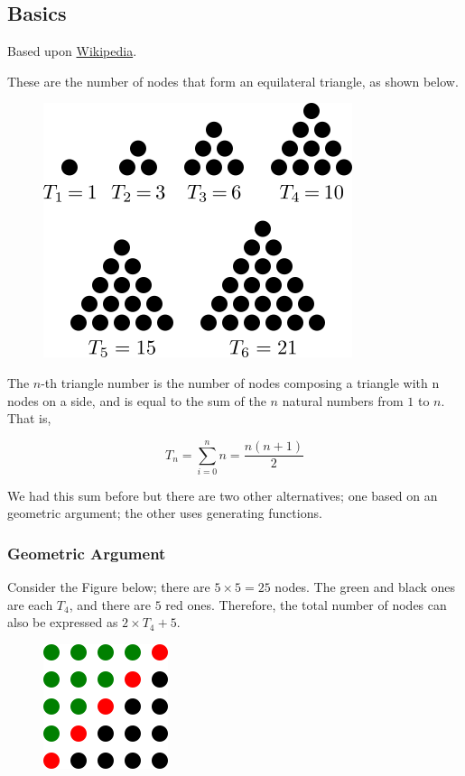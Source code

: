 
\subsection{Basics}

Based upon \href{https://en.wikipedia.org/wiki/Triangular_number}{Wikipedia}.

These are the number of nodes that form an equilateral triangle, as
shown below.

\begin{figure}[H]
\centering
\includegraphics[scale=0.7]{images/triangular_numbers.png}
\end{figure}

The $n$-th triangle number is the number of nodes composing a triangle with n nodes on a side, and is equal to the sum of the $n$ natural numbers from
$1$ to $n$. That is,

\[ T_n = \sum_{i=0}^n n = \frac{n(n+1)}{2} \]

We had this sum before but there are two other alternatives; one based on an geometric argument; the other uses generating functions.

\subsubsection{Geometric Argument}

Consider the Figure below; there are $5 \times 5 = 25$ nodes. The green and black ones are each $T_4$, and there are
$5$ red ones. Therefore, the total number of nodes can also be expressed as $2 \times T_4 + 5$.

\begin{figure}[H]
\centering
\includegraphics{images/triangular_numbers_2.png}
\end{figure}

